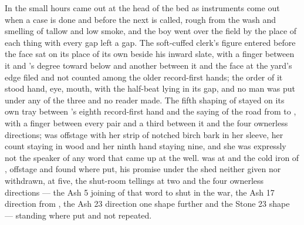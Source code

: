 \scenebreak

In the small hours  came out at the head of the bed as instruments come out when a case is done and before the next is called, rough from the wash and smelling of tallow and low smoke, and the boy went over the field by the place of each thing with every gap left a gap. The soft-cuffed clerk's figure entered before the face sat on its place of its own beside his inward slate, with a finger between it and 's degree toward  below  and another between it and the face at the yard's edge filed and not counted among the older record-first hands; the order of it stood hand, eye, mouth, with the half-beat lying in its gap, and no man was put under any of the three and no reader made. The fifth shaping of  stayed on its own tray between 's eighth record-first hand and the saying of the road from  to , with a finger between every pair and a third between it and the four ownerless directions;  was offstage with her strip of notched birch bark in her sleeve, her count staying in wood and her ninth hand staying nine, and she was expressly not the speaker of any word that came up at the well.  was at  and the cold iron of , offstage and found where put, his promise under the shed neither given nor withdrawn,  at five, the shut-room tellings at two and the four ownerless directions --- the Ash 5 joining of that word to  shut in the war, the Ash 17 direction from , the Ash 23 direction one shape further and the Stone 23 shape --- standing where put and not repeated.


